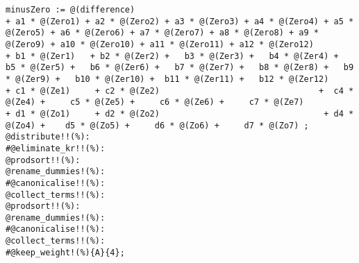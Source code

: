 \documentclass[11pt]{article}
\begin{document}
{\color[named]{Blue}\begin{verbatim}
minusZero := @(difference) 
+ a1 * @(Zero1) + a2 * @(Zero2) + a3 * @(Zero3) + a4 * @(Zero4) + a5 * @(Zero5) + a6 * @(Zero6) + a7 * @(Zero7) + a8 * @(Zero8) + a9 * @(Zero9) + a10 * @(Zero10) + a11 * @(Zero11) + a12 * @(Zero12) 
+ b1 * @(Zer1)   + b2 * @(Zer2) +   b3 * @(Zer3) +   b4 * @(Zer4) +   b5 * @(Zer5) +   b6 * @(Zer6) +   b7 * @(Zer7) +   b8 * @(Zer8) +   b9 * @(Zer9) +   b10 * @(Zer10) +  b11 * @(Zer11) +   b12 * @(Zer12)
+ c1 * @(Ze1)     + c2 * @(Ze2)                                +  c4 * @(Ze4) +     c5 * @(Ze5) +     c6 * @(Ze6) +     c7 * @(Ze7) 
+ d1 * @(Zo1)     + d2 * @(Zo2)                                 + d4 * @(Zo4) +    d5 * @(Zo5) +     d6 * @(Zo6) +     d7 * @(Zo7) ;
@distribute!!(%):
#@eliminate_kr!!(%):
@prodsort!!(%):
@rename_dummies!(%):
#@canonicalise!!(%):
@collect_terms!!(%):
@prodsort!!(%):
@rename_dummies!(%):
#@canonicalise!!(%):
@collect_terms!!(%):
#@keep_weight!(%){A}{4};
\end{verbatim}}
\end{document}

